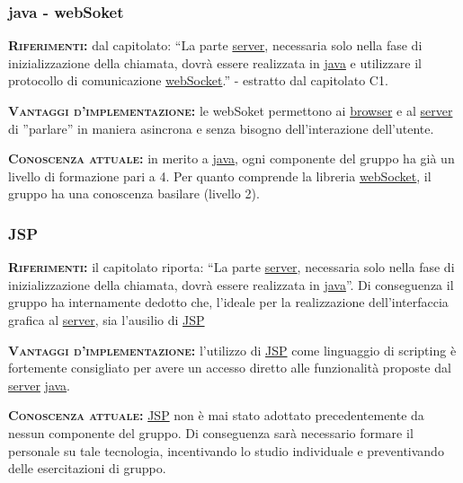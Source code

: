 \subsubsection{java - webSoket}
\begin{description}
	\item{\scshape\bfseries Riferimenti:} dal capitolato: ``La parte \underline{server}, necessaria solo nella fase di inizializzazione della chiamata, dovrà essere realizzata in \underline{java} e utilizzare il protocollo di comunicazione \underline{webSocket}.'' - estratto dal capitolato C1.
	
	\item{\scshape\bfseries Vantaggi d'implementazione:} le webSoket permettono ai \underline{browser} e al \underline{server} di ''parlare'' in maniera asincrona e senza bisogno dell'interazione dell'utente.

	\item{\scshape\bfseries Conoscenza attuale:} in merito a \underline{java}, ogni componente del gruppo ha già un livello di formazione pari a 4. Per quanto comprende la libreria  \underline{webSocket}, il gruppo ha una conoscenza basilare (livello 2).  
\end{description}
\subsubsection{JSP}
\begin{description}
	\item{\scshape\bfseries Riferimenti:} il capitolato riporta: ``La parte \underline{server}, necessaria solo nella fase di inizializzazione della chiamata, dovrà essere realizzata in \underline{java}''. Di conseguenza il gruppo ha internamente dedotto che, l'ideale per la realizzazione dell'interfaccia grafica al \underline{server}, sia l'ausilio di \underline{JSP}
	
	\item{\scshape\bfseries Vantaggi d'implementazione:} l'utilizzo di \underline{JSP} come linguaggio di scripting è fortemente consigliato per avere un accesso diretto alle funzionalità proposte dal \underline{server} \underline{java}.

	\item{\scshape\bfseries Conoscenza attuale:} \underline{JSP} non è mai stato adottato precedentemente da nessun componente del gruppo. Di conseguenza sarà necessario formare il personale su tale tecnologia, incentivando lo studio individuale e preventivando delle esercitazioni di gruppo.
\end{description}

